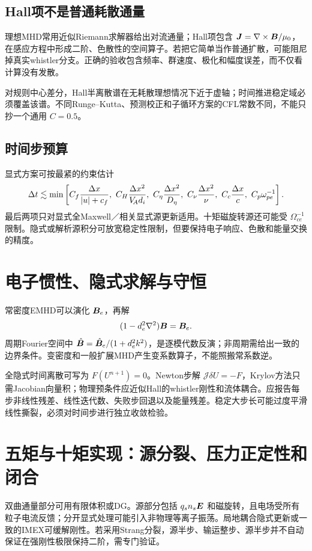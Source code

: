 \subsection{Hall项不是普通耗散通量}
理想MHD常用近似Riemann求解器给出对流通量；Hall项包含 $\bm{J}=\nabla\times\bm{B}/\mu_0$，在感应方程中形成二阶、色散性的空间算子。若把它简单当作普通扩散，可能阻尼掉真实whistler分支。正确的验收包含频率、群速度、极化和幅度误差，而不仅看计算没有发散。

对规则中心差分，Hall半离散谱在无耗散理想情况下近于虚轴；时间推进稳定域必须覆盖该谱。不同Runge--Kutta、预测校正和子循环方案的CFL常数不同，不能只抄一个通用 $C=0.5$。

\subsection{时间步预算}
显式方案可按最紧的约束估计
\begin{equation}\Delta t\lesssim\min\left[C_f{\Delta x\over |u|+c_f},\ C_H{\Delta x^2\over \VA d_i},\ C_\eta{\Delta x^2\over D_\eta},\ C_\nu{\Delta x^2\over\nu},\ C_c{\Delta x\over c},\ C_p\omega_{pe}^{-1}\right].
\end{equation}
最后两项只对显式全Maxwell／相关显式源更新适用。十矩磁旋转源还可能受 $\Omega_{ce}^{-1}$ 限制。隐式或解析源积分可放宽稳定性限制，但要保持电子响应、色散和能量交换的精度。

\section{电子惯性、隐式求解与守恒}
常密度EMHD可以演化 $\bm{B}_e$，再解
\begin{equation}(1-d_e^2\nabla^2)\bm{B}=\bm{B}_e.
\end{equation}
周期Fourier空间中 $\hat{\bm{B}}=\hat{\bm{B}}_e/(1+d_e^2k^2)$，是逐模代数反演；非周期需给出一致的边界条件。变密度和一般扩展MHD产生变系数算子，不能照搬常系数逆。

全隐式时间离散可写为 $F(U^{n+1})=0$。Newton步解 $\mathcal J\delta U=-F$，Krylov方法只需Jacobian向量积；物理预条件应近似Hall的whistler刚性和流体耦合。应报告每步非线性残差、线性迭代数、失败步回退以及能量残差。稳定大步长可能过度平滑线性撕裂，必须对时间步进行独立收敛检验。\citep{Arnold2008,Toth2008}

\section{五矩与十矩实现：源分裂、压力正定性和闭合}
双曲通量部分可用有限体积或DG。源部分包括 $q_sn_s\bm{E}$ 和磁旋转，且电场受所有粒子电流反馈；分开显式处理可能引入非物理等离子振荡。局地耦合隐式更新或一致的IMEX可缓解刚性。若采用Strang分裂，源半步、输运整步、源半步并不自动保证在强刚性极限保持二阶，需专门验证。

